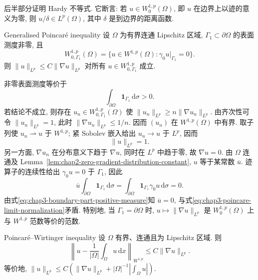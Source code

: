 后半部分证明 Hardy 不等式. 它断言: 若 $u\in W_0^{1,p}(\Omega)$, 即 $u$ 在边界上以迹的意义为零, 则 $u/\delta\in L^p(\Omega)$, 其中 $\delta$ 是到边界的距离函数.

\begin{Proposition}{Generalised Poincar\'e inequality}
\label{prop:chap3-generalized-poincare}
设 $\Omega$ 为有界连通 Lipschitz 区域, $\Gamma_1\subset\partial\Omega$ 的表面测度非零, 且
\[
 W_{0,\Gamma_1}^{1,p}(\Omega)=\{u\in W^{1,p}(\Omega):\gamma_0u|_{\Gamma_1}=0\}.
\]
则 $\|u\|_{L^p}\leq C\|\nabla u\|_{L^p}$ 对所有 $u\in W_{0,\Gamma_1}^{1,p}$ 成立.
\end{Proposition}

\begin{Proof}
非零表面测度等价于
\begin{equation}
 \int_{\partial\Omega}\mathbf1_{\Gamma_1}\,\mathrm d\sigma>0.
 \label{eq:chap3-boundary-part-positive-measure}
\end{equation}
若结论不成立, 则存在 $u_n\in W_{0,\Gamma_1}^{1,p}(\Omega)$ 使 $\|u_n\|_{L^p}\geq n\|\nabla u_n\|_{L^p}$. 由齐次性可令 $\|u_n\|_{L^p}=1$, 此时 $\|\nabla u_n\|_{L^p}\leq1/n$. 因而 $(u_n)$ 在 $W^{1,p}(\Omega)$ 中有界. 取子列使 $u_n\rightharpoonup u$ 于 $W^{1,p}$; 紧 Sobolev 嵌入给出 $u_n\to u$ 于 $L^p$, 因而
\begin{equation}
 \|u\|_{L^p}=1.
 \label{eq:chap3-poincare-limit-normalization}
\end{equation}
另一方面, $\nabla u_n$ 在分布意义下趋于 $\nabla u$, 同时在 $L^p$ 中趋于零, 故 $\nabla u=0$. 由 $\Omega$ 连通及 Lemma~\ref{lem:chap2-zero-gradient-distribution-constant}, $u$ 等于某常数 $\overline u$. 迹算子的连续性给出 $\gamma_0u=0$ 于 $\Gamma_1$, 因此
\[
 \overline u\int_{\partial\Omega}\mathbf1_{\Gamma_1}\,\mathrm d\sigma
 =\int_{\partial\Omega}\mathbf1_{\Gamma_1}\gamma_0u\,\mathrm d\sigma=0.
\]
由式\eqref{eq:chap3-boundary-part-positive-measure}知 $\overline u=0$, 与式\eqref{eq:chap3-poincare-limit-normalization}矛盾. 特别地, 当 $\Gamma_1=\partial\Omega$ 时, $u\mapsto\|\nabla u\|_{L^p}$ 是 $W_0^{1,p}(\Omega)$ 上与 $W^{1,p}$ 范数等价的范数.
\end{Proof}

\begin{Proposition}{Poincar\'e--Wirtinger inequality}
\label{prop:chap3-poincare-wirtinger}
设 $\Omega$ 有界、连通且为 Lipschitz 区域. 则
\[
 \left\|u-\frac1{|\Omega|}\int_\Omega u\,\mathrm dx\right\|_{W^{1,p}}
 \leq C\|\nabla u\|_{L^p}.
\]
等价地, $\|u\|_{L^p}\leq C(\|\nabla u\|_{L^p}+|\Omega|^{-1}|\int_\Omega u|)$.
\end{Proposition}

